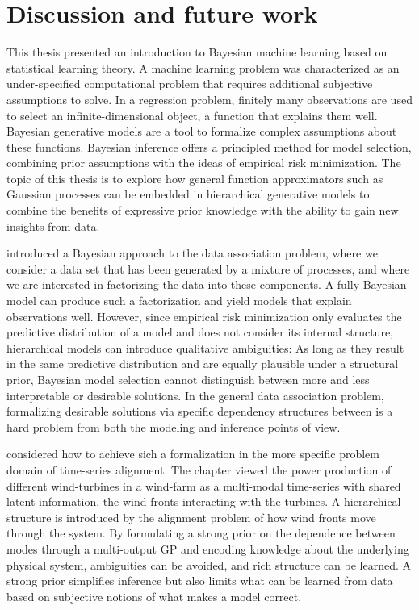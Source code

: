 \chapter{Discussion and future work}
\label{toc:discussion}
This thesis presented an introduction to Bayesian machine learning based on statistical learning theory.
A machine learning problem was characterized as an under-specified computational problem that requires additional subjective assumptions to solve.
In a regression problem, finitely many observations are used to select an infinite-dimensional object, a function that explains them well.
Bayesian generative models are a tool to formalize complex assumptions about these functions.
Bayesian inference offers a principled method for model selection, combining prior assumptions with the ideas of empirical risk minimization.
The topic of this thesis is to explore how general function approximators such as Gaussian processes can be embedded in hierarchical generative models to combine the benefits of expressive prior knowledge with the ability to gain new insights from data.

 introduced a Bayesian approach to the data association problem, where we consider a data set that has been generated by a mixture of processes, and where we are interested in factorizing the data into these components.
A fully Bayesian model can produce such a factorization and yield models that explain observations well.
However, since empirical risk minimization only evaluates the predictive distribution of a model and does not consider its internal structure, hierarchical models can introduce qualitative ambiguities:
As long as they result in the same predictive distribution and are equally plausible under a structural prior, Bayesian model selection cannot distinguish between more and less interpretable or desirable solutions.
In the general data association problem, formalizing desirable solutions via specific dependency structures between is a hard problem from both the modeling and inference points of view.

 considered how to achieve sich a formalization in the more specific problem domain of time-series alignment.
The chapter viewed the power production of different wind-turbines in a wind-farm as a multi-modal time-series with shared latent information, the wind fronts interacting with the turbines.
A hierarchical structure is introduced by the alignment problem of how wind fronts move through the system.
By formulating a strong prior on the dependence between modes through a multi-output GP and encoding knowledge about the underlying physical system, ambiguities can be avoided, and rich structure can be learned.
A strong prior simplifies inference but also limits what can be learned from data based on subjective notions of what makes a model correct.

